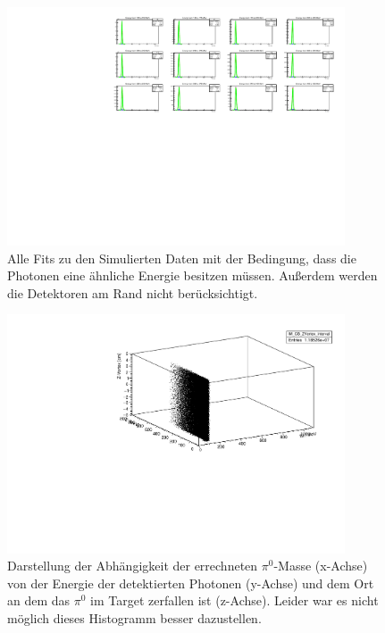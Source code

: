 \documentclass[a4paper,11pt,oneside,final,german,openbib,pdftex]{scrbook}
\begin{document}
{\begin{appendix}
\begin{figure}[h!]
	\begin{center}
		\includegraphics[width=100mm]{2017180430DegreeCut}
		\caption{Alle Fits zu den Simulierten Daten mit der Bedingung, dass die Photonen eine \"ahnliche Energie besitzen m\"ussen. Au{\ss}erdem werden die Detektoren am Rand nicht ber\"ucksichtigt.}
		\label{fig:Sim-30-Degree-Cut-All-Fits}
	\end{center}
\end{figure}


\begin{figure}[h!]
	\begin{center}
		\includegraphics[width=100mm]{20171804ZVertex3DHist}
		\caption{Darstellung der Abh\"angigkeit der errechneten $\pi^0$-Masse (x-Achse) von der Energie der detektierten Photonen (y-Achse) und dem Ort an dem das $\pi^0$ im Target zerfallen ist (z-Achse).
		Leider war es nicht m\"oglich dieses Histogramm besser dazustellen.}
	\label{fig:Z-Vertex-3D-Hist}
	\end{center}
\end{figure}



\end{appendix}}
\end{document}
